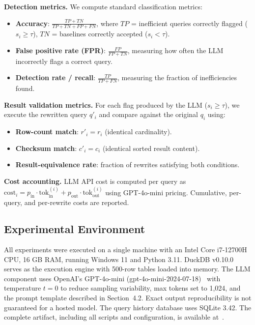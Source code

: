 \documentclass[conference]{IEEEtran}
\begin{document}
\noindent\textbf{Detection metrics.} We compute standard classification metrics:
\begin{itemize}
\item \textbf{Accuracy}: $\frac{TP + TN}{TP + TN + FP + FN}$, where $TP$ = inefficient queries correctly flagged ($s_i \geq \tau$), $TN$ = baselines correctly accepted ($s_i < \tau$).
\item \textbf{False positive rate (FPR)}: $\frac{FP}{FP + TN}$, measuring how often the LLM incorrectly flags a correct query.
\item \textbf{Detection rate / recall}: $\frac{TP}{TP + FN}$, measuring the fraction of inefficiencies found.
\end{itemize}

\noindent\textbf{Result validation metrics.} For each flag produced by the LLM ($s_i \geq \tau$), we execute the rewritten query $q'_i$ and compare against the original $q_i$ using:
\begin{itemize}
\item \textbf{Row-count match}: $r'_i = r_i$ (identical cardinality).
\item \textbf{Checksum match}: $c'_i = c_i$ (identical sorted result content).
\item \textbf{Result-equivalence rate}: fraction of rewrites satisfying both conditions.
\end{itemize}

\noindent\textbf{Cost accounting.} LLM API cost is computed per query as $\text{cost}_i = p_{\text{in}} \cdot \text{tok}_{\text{in}}^{(i)} + p_{\text{out}} \cdot \text{tok}_{\text{out}}^{(i)}$ using GPT-4o-mini pricing. Cumulative, per-query, and per-rewrite costs are reported.

\subsection{Experimental Environment}
All experiments were executed on a single machine with an Intel Core i7-12700H CPU, 16 GB RAM, running Windows 11 and Python 3.11. DuckDB v0.10.0 serves as the execution engine with 500-row tables loaded into memory. The LLM component uses OpenAI's GPT-4o-mini (gpt-4o-mini-2024-07-18)~\cite{openai2026models} with temperature $t = 0$ to reduce sampling variability, max tokens set to 1,024, and the prompt template described in Section~4.2. Exact output reproducibility is not guaranteed for a hosted model. The query history database uses SQLite 3.42. The complete artifact, including all scripts and configuration, is available at~\cite{sharma2026framework}.
\end{document}

